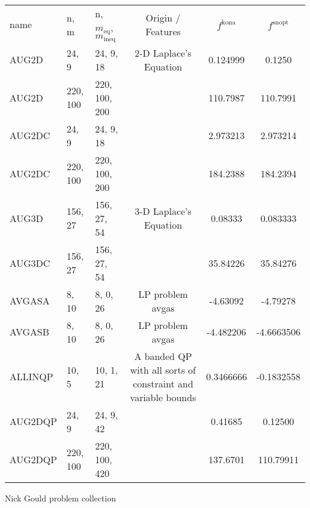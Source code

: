 \documentclass{article}
\begin{document}
\begin{tabular}{l | l | l | c | c | c } \toprule
name   &                 n,   m       &  n,  $m_{\text{eq}}$,  $m_{\text{ineq}}$        &     Origin / Features              & $ f^{\text{kona}} $   & $ f^{\text{snopt}} $    \\ 
AUG2D    &           24,  9         &  24,   9,  18       &    2-D Laplace's Equation    &  0.124999           &     0.1250                      \\
AUG2D    &          220, 100   & 220, 100, 200  &                                 &   110.7987          &    110.7991                 \\
AUG2DC  &       24, 9      &   24, 9, 18       &       &       2.973213                & 2.973214    \\
AUG2DC  &      220, 100   &  220, 100, 200   &     & 184.2388    &   184.2394   \\
AUG3D  &      156, 27    & 156, 27, 54   & 3-D Laplace's Equation  & 0.08333   &   0.083333   \\
AUG3DC  &  156, 27  &  156, 27, 54   &    &   35.84226   &   35.84276   \\
AVGASA  &       8, 10   &   8, 0, 26   &            LP problem avgas               &           -4.63092    &    -4.79278   \\
AVGASB  &    8, 10  &   8, 0, 26   &   LP problem avgas         &   -4.482206   &   -4.6663506   \\
ALLINQP  & 10, 5   &  10, 1, 21   & A banded QP with all sorts of constraint and variable bounds  & 0.3466666  & -0.1832558 \\ \midrule
AUG2DQP  &   24, 9      &  24,  9,  42     &                                   &    0.41685              &      0.12500      \\
AUG2DQP  &   220, 100  & 220, 100,  420  &                    &   137.6701     &   110.79911   \\
\bottomrule
\end{tabular}   %


Nick Gould problem collection
\end{document}
